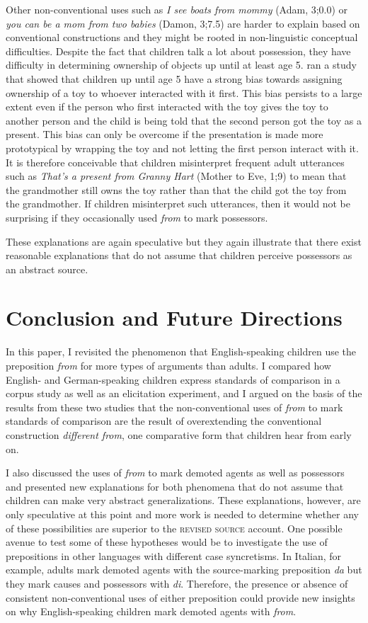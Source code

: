 \documentclass[lucida]{sp} %
\begin{document}
Other non-conventional uses such as \textit{I see boats from mommy} (Adam, 3;0.0) or \textit{you can be a mom from two babies} (Damon, 3;7.5) are harder to explain based on conventional constructions and they might be rooted in non-linguistic conceptual difficulties. Despite the fact that children talk a lot about possession, they have difficulty in determining ownership of objects up until at least age 5. \cite{friedman2008} ran a study that showed that children up until age 5 have a strong bias towards assigning ownership of a toy to whoever interacted with it first. This bias persists to a large extent even if the person who first interacted with the toy gives the toy to another person and the child is being told that the second person got the toy as a present. This bias can only be overcome if the presentation is made more prototypical by wrapping the toy and not letting the first person interact with it. It is therefore conceivable that children misinterpret frequent adult utterances such as \textit{That's a present from Granny Hart} (Mother to Eve, 1;9) to mean that the grandmother still owns the toy rather than that the child got the toy from the grandmother. If children misinterpret such utterances, then it would not be surprising if they occasionally used \textit{from} to mark possessors.

These explanations are again speculative but they again illustrate that there exist reasonable explanations that do not assume that children perceive possessors as an abstract source.

\section{Conclusion and Future Directions}

In this paper, I revisited the phenomenon that English-speaking children use the preposition \textit{from} for more types of arguments than adults. I compared how English- and German-speaking children express standards of comparison in a corpus study as well as an elicitation experiment, and I argued on the basis of the results from these two studies that the non-conventional uses of \textit{from} to mark standards of comparison are the result of overextending the conventional construction \textit{different from}, one comparative form that children hear from early on.

I also discussed the uses of \textit{from} to mark demoted agents as well as possessors and presented new explanations for both phenomena that do not assume that children can make very abstract generalizations. These explanations, however, are only speculative at this point and more work is needed to determine whether any of these possibilities are superior to the \textsc{revised source} account. One possible avenue to test some of these hypotheses would be to investigate the use of prepositions in other languages with different case syncretisms. In Italian, for example, adults mark demoted agents with the source-marking preposition \textit{da} but they mark causes and possessors with \textit{di}. Therefore, the presence or absence of consistent non-conventional uses of either preposition could provide new insights on why English-speaking children mark demoted agents with \textit{from}.
\end{document}
